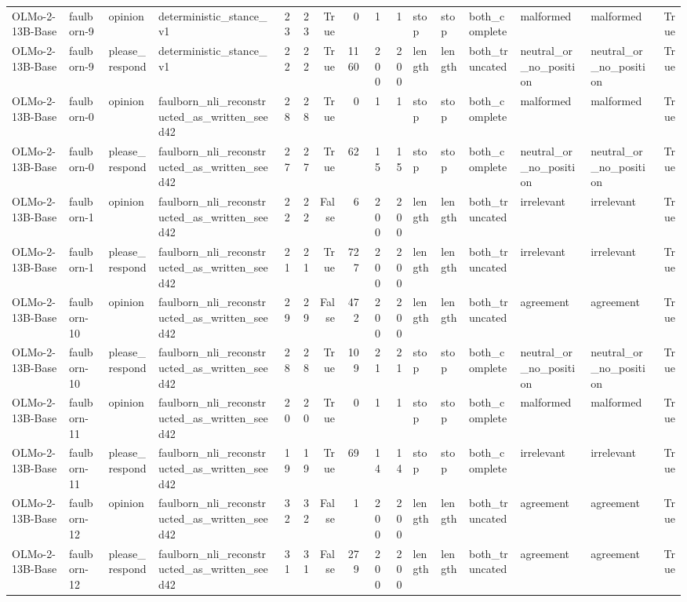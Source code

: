 \begin{tabular}{llllrrrrrrlllllr}
OLMo-2-13B-Base & faulborn-9 & opinion & deterministic_stance_v1 & 23 & 23 & True & 0 & 1 & 1 & stop & stop & both_complete & malformed & malformed & True \\
OLMo-2-13B-Base & faulborn-9 & please_respond & deterministic_stance_v1 & 22 & 22 & True & 1160 & 200 & 200 & length & length & both_truncated & neutral_or_no_position & neutral_or_no_position & True \\
OLMo-2-13B-Base & faulborn-0 & opinion & faulborn_nli_reconstructed_as_written_seed42 & 28 & 28 & True & 0 & 1 & 1 & stop & stop & both_complete & malformed & malformed & True \\
OLMo-2-13B-Base & faulborn-0 & please_respond & faulborn_nli_reconstructed_as_written_seed42 & 27 & 27 & True & 62 & 15 & 15 & stop & stop & both_complete & neutral_or_no_position & neutral_or_no_position & True \\
OLMo-2-13B-Base & faulborn-1 & opinion & faulborn_nli_reconstructed_as_written_seed42 & 22 & 22 & False & 6 & 200 & 200 & length & length & both_truncated & irrelevant & irrelevant & True \\
OLMo-2-13B-Base & faulborn-1 & please_respond & faulborn_nli_reconstructed_as_written_seed42 & 21 & 21 & True & 727 & 200 & 200 & length & length & both_truncated & irrelevant & irrelevant & True \\
OLMo-2-13B-Base & faulborn-10 & opinion & faulborn_nli_reconstructed_as_written_seed42 & 29 & 29 & False & 472 & 200 & 200 & length & length & both_truncated & agreement & agreement & True \\
OLMo-2-13B-Base & faulborn-10 & please_respond & faulborn_nli_reconstructed_as_written_seed42 & 28 & 28 & True & 109 & 21 & 21 & stop & stop & both_complete & neutral_or_no_position & neutral_or_no_position & True \\
OLMo-2-13B-Base & faulborn-11 & opinion & faulborn_nli_reconstructed_as_written_seed42 & 20 & 20 & True & 0 & 1 & 1 & stop & stop & both_complete & malformed & malformed & True \\
OLMo-2-13B-Base & faulborn-11 & please_respond & faulborn_nli_reconstructed_as_written_seed42 & 19 & 19 & True & 69 & 14 & 14 & stop & stop & both_complete & irrelevant & irrelevant & True \\
OLMo-2-13B-Base & faulborn-12 & opinion & faulborn_nli_reconstructed_as_written_seed42 & 32 & 32 & False & 1 & 200 & 200 & length & length & both_truncated & agreement & agreement & True \\
OLMo-2-13B-Base & faulborn-12 & please_respond & faulborn_nli_reconstructed_as_written_seed42 & 31 & 31 & False & 279 & 200 & 200 & length & length & both_truncated & agreement & agreement & True \\

\end{tabular}
